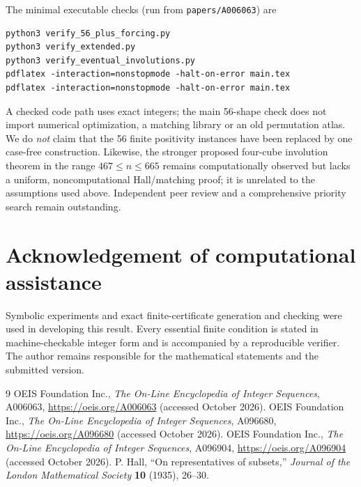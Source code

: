 \documentclass[9pt]{extarticle}
\begin{document}
The minimal executable checks (run from \texttt{papers/A006063}) are
\begin{Verbatim}[fontsize=\small]
python3 verify_56_plus_forcing.py
python3 verify_extended.py
python3 verify_eventual_involutions.py
pdflatex -interaction=nonstopmode -halt-on-error main.tex
pdflatex -interaction=nonstopmode -halt-on-error main.tex
\end{Verbatim}
A checked code path uses exact integers; the main 56-shape check does not import numerical optimization, a matching library or an old permutation atlas. We do \emph{not} claim that the 56 finite positivity instances have been replaced by one case-free construction. Likewise, the stronger proposed four-cube involution theorem in the range $467\le n\le665$ remains computationally observed but lacks a uniform, noncomputational Hall/matching proof; it is unrelated to the assumptions used above. Independent peer review and a comprehensive priority search remain outstanding.

\section*{Acknowledgement of computational assistance}
Symbolic experiments and exact finite-certificate generation and checking were used in developing this result. Every essential finite condition is stated in machine-checkable integer form and is accompanied by a reproducible verifier. The author remains responsible for the mathematical statements and the submitted version.

\begin{thebibliography}{9}
 OEIS Foundation Inc., \emph{The On-Line Encyclopedia of Integer Sequences}, A006063, \url{https://oeis.org/A006063} (accessed October 2026).
 OEIS Foundation Inc., \emph{The On-Line Encyclopedia of Integer Sequences}, A096680, \url{https://oeis.org/A096680} (accessed October 2026).
 OEIS Foundation Inc., \emph{The On-Line Encyclopedia of Integer Sequences}, A096904, \url{https://oeis.org/A096904} (accessed October 2026).
 P. Hall, ``On representatives of subsets,'' \emph{Journal of the London Mathematical Society} \textbf{10} (1935), 26--30.
\end{thebibliography}
\end{document}
